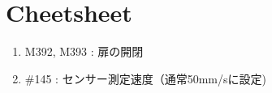 




\section{Cheetsheet}
\begin{enumerate}
\item M392, M393 : 扉の開閉
\item \#145 : センサー測定速度（通常50mm/sに設定)
\end{enumerate}
